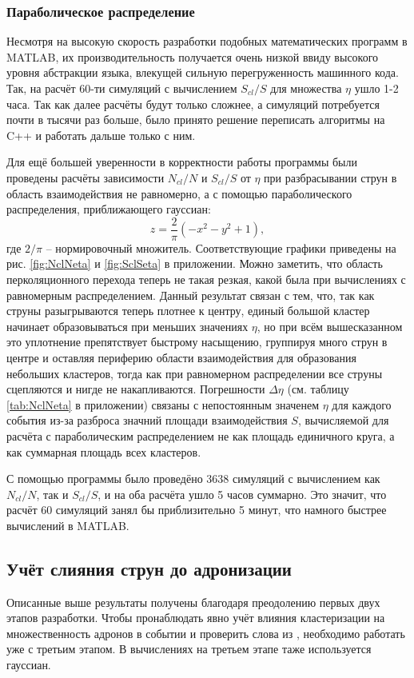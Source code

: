 \subsubsection{Параболическое распределение}
Несмотря на высокую скорость разработки подобных математических программ в MATLAB, их производительность получается очень низкой ввиду высокого уровня абстракции языка, влекущей сильную перегруженность машинного кода. Так, на расчёт 60-ти симуляций с вычислением $S_{cl}/S$ для множества $\eta$ ушло 1-2 часа. Так как далее расчёты будут только сложнее, а симуляций потребуется почти в тысячи раз больше, было принято решение переписать алгоритмы на C++ и работать дальше только с ним.

Для ещё большей уверенности в корректности работы программы были проведены расчёты зависимости $N_{cl}/N$ и $S_{cl}/S$ от $\eta$ при разбрасывании струн в область взаимодействия не равномерно, а с помощью параболического распределения, приближающего гауссиан:
\begin{equation} \label{eq:parab}
	z = \frac{2}{\pi} (-x^2 - y^2 + 1),
\end{equation}
где $2/\pi$ -- нормировочный множитель.  Соответствующие графики приведены на рис. \ref{fig:NclNeta} и \ref{fig:SclSeta} в приложении. 
Можно заметить, что область перколяционного перехода теперь не такая резкая, какой была при вычислениях с равномерным распределением. 
Данный результат связан с тем, что, так как струны разыгрываются теперь плотнее к центру, единый большой кластер начинает образовываться при меньших значениях $\eta$, но при всём вышесказанном это уплотнение препятствует быстрому насыщению, группируя много струн в центре и оставляя периферию области взаимодействия для образования небольших кластеров, тогда как при равномерном распределении все струны сцепляются и нигде не накапливаются.
Погрешности $\Delta \eta$ (см. таблицу \ref{tab:NclNeta} в приложении) связаны с непостоянным значенем $\eta$ для каждого события из-за разброса значний площади взаимодействия $S$, вычисляемой для расчёта с параболическим распределением не как площадь единичного круга, а как суммарная площадь всех кластеров. 

С помощью программы было проведёно 3638 симуляций с вычислением как $N_{cl}/N$, так и $S_{cl}/S$, и на оба расчёта ушло 5 часов суммарно. Это значит, что расчёт 60 симуляций занял бы приблизительно 5 минут, что намного быстрее вычислений в MATLAB. 
\subsection{Учёт слияния струн до адронизации}
Описанные выше результаты получены благодаря преодолению первых двух этапов разработки. Чтобы пронаблюдать явно учёт влияния кластеризации на множественность адронов в событии и проверить слова из \cite{MulReduction}, необходимо работать уже с третьим этапом. В вычислениях на третьем этапе таже используется гауссиан.

